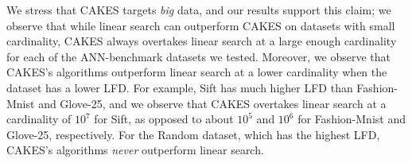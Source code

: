 We stress that CAKES targets \emph{big} data, and our results support this claim; we
observe that while linear search can outperform CAKES on datasets with small cardinality, CAKES always overtakes
linear search at a large enough cardinality for each of the ANN-benchmark datasets we tested. 
Moreover, we observe
that CAKES’s algorithms outperform linear search at a lower cardinality when the dataset has a lower LFD. For example,
Sift has much higher LFD than Fashion-Mnist and Glove-25, and we observe that CAKES overtakes linear search at
a cardinality of $10^{7}$ 
for Sift, as opposed to about $10^{5}$
and $10^{6}$ 
for Fashion-Mnist and Glove-25, respectively. For the
Random dataset, which has the highest LFD, CAKES’s algorithms \emph{never} outperform linear search.







